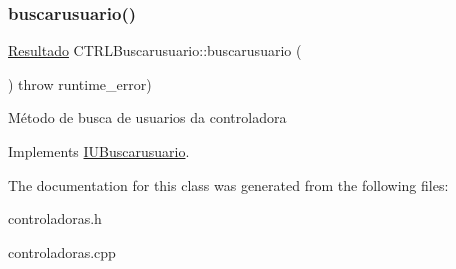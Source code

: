\subsubsection{\texorpdfstring{buscarusuario()}{buscarusuario()}}
{\footnotesize\ttfamily \hyperlink{classResultado}{Resultado} C\+T\+R\+L\+Buscarusuario\+::buscarusuario (\begin{DoxyParamCaption}{ }\end{DoxyParamCaption}) throw  runtime\+\_\+error) \hspace{0.3cm}{\ttfamily [virtual]}}

Método de busca de usuarios da controladora 

Implements \hyperlink{classIUBuscarusuario}{I\+U\+Buscarusuario}.



The documentation for this class was generated from the following files\+:\begin{DoxyCompactItemize}
\item 
controladoras.\+h\item 
controladoras.\+cpp\end{DoxyCompactItemize}
